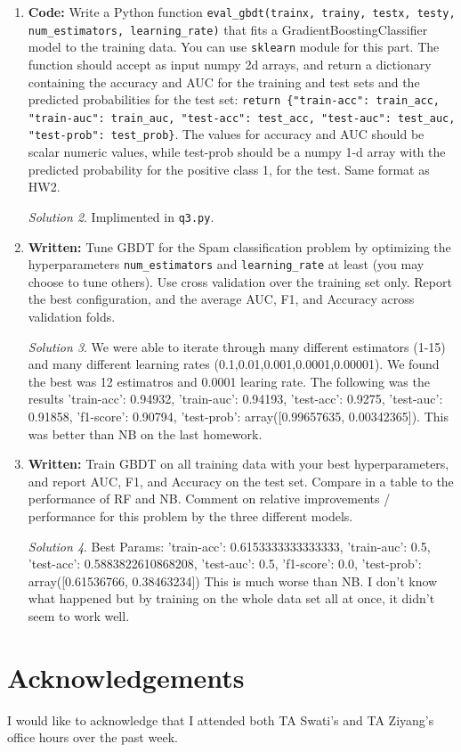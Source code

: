 \documentclass[a4paper,12pt]{article}
\theoremstyle{definition}
\theoremstyle{remark}
\newtheorem*{solution}{Solution}
\begin{document}
\begin{enumerate}
\begin{enumerate}
\begin{solution}
			\end{solution}
			\item {\bf Code:} Write a Python function {\tt eval\_gbdt(trainx, trainy, testx, testy, num\_estimators, learning\_rate)} that fits
			a GradientBoostingClassifier model to the training data. You can use {\tt sklearn} module for this part. The function should accept as input numpy 2d arrays, and return a dictionary containing the accuracy and AUC for the training and test sets and the predicted probabilities for the test set: {\tt return \{"train-acc": train\_acc, "train-auc": train\_auc, "test-acc": test\_acc, "test-auc": test\_auc, "test-prob": test\_prob\}}. The values for accuracy and AUC should be scalar numeric values, while test-prob should be a numpy 1-d array with the predicted probability for the positive class 1, for the test. Same format as HW2.
			\begin{solution}
				 Implimented in \texttt{q3.py}.
			\end{solution}
			\item {\bf Written:} Tune GBDT for the Spam classification problem by optimizing the hyperparameters {\tt num\_estimators} and {\tt learning\_rate} at least (you may choose to tune others). Use cross validation over the training set only. Report the best configuration, and the average AUC, F1, and Accuracy across validation folds.
			\begin{solution}
				We were able to iterate through many different estimators (1-15) and many different learning rates (0.1,0.01,0.001,0.0001,0.00001). We found the best was 12 estimatros and 0.0001 learing rate. The following was the results
				{'train-acc': 0.94932, 'train-auc': 0.94193, 'test-acc': 0.9275, 'test-auc': 0.91858, 'f1-score': 0.90794, 'test-prob': array([0.99657635, 0.00342365])}. This was better than NB on the last homework.
			\end{solution}
			\item {\bf Written:} Train GBDT on all training data with your best hyperparameters, and report AUC, F1, and Accuracy
			on the test set. Compare in a table to the performance of RF and NB. Comment on relative improvements / performance for this problem by the three different models.
			\begin{solution}
			Best Params:
			{'train-acc': 0.6153333333333333, 'train-auc': 0.5, 'test-acc': 0.5883822610868208, 'test-auc': 0.5, 'f1-score': 0.0, 'test-prob': array([0.61536766, 0.38463234])}
			This is much worse than NB. I don't know what happened but by training on the whole data set all at once, it didn't seem to work well.
			\end{solution}
		\end{enumerate}
		
	\end{enumerate}
	
	
	
	
	\section*{Acknowledgements}
	I would like to acknowledge that I attended both TA Swati's and TA Ziyang's office hours over the past week.
	
\end{document}
